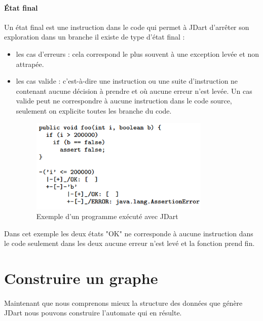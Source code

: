 \paragraph{État final}
Un état final est une instruction dans le code qui permet à JDart d'arrêter son 
exploration dans un branche il existe de type d'état final : 
\begin{itemize}
 \item les cas d'erreurs : cela correspond le plus souvent à une exception 
levée et non attrapée.
 \item les cas valide : c'est-à-dire une instruction ou une suite 
d'instruction ne contenant aucune décision à prendre et où aucune erreur n'est 
levée. Un cas valide peut ne correspondre à aucune instruction dans le code 
source, seulement on explicite toutes les branche du code.

\begin{figure}[H]
	\centering	
	\includegraphics[scale=0.5]{images/jdart_exemple.png}
	\caption{\label{fig:jdart_sample} Exemple d'un programme exécuté avec 
JDart}
	\end{figure}
\end{itemize}

Dans cet exemple les deux états "OK" ne corresponde à aucune instruction dans 
le code seulement dans les deux aucune erreur n'est levé et la fonction prend 
fin.


\section{Construire un graphe}

\paragraph{}
Maintenant que nous comprenons mieux la structure des données que génère JDart 
nous pouvons construire l'automate qui en résulte.



